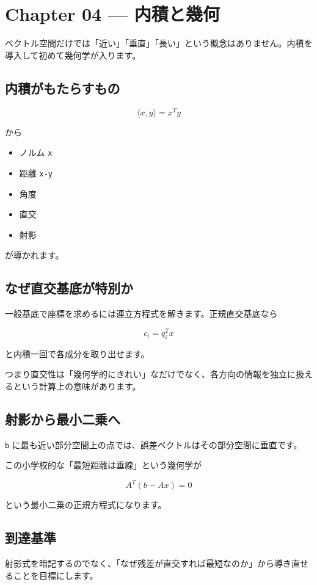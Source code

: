 \documentclass[
  11pt,
  a4paper,
]{ltjsarticle}
\author{}
\date{}
\providecommand{\tightlist}{%
  \setlength{\itemsep}{0pt}\setlength{\parskip}{0pt}}
\begin{document}
\hypertarget{chapter-04-ux5185ux7a4dux3068ux5e7eux4f55}{%
\section{Chapter 04 ---
内積と幾何}\label{chapter-04-ux5185ux7a4dux3068ux5e7eux4f55}}

ベクトル空間だけでは「近い」「垂直」「長い」という概念はありません。内積を導入して初めて幾何学が入ります。

\hypertarget{ux5185ux7a4dux304cux3082ux305fux3089ux3059ux3082ux306e}{%
\subsection{内積がもたらすもの}\label{ux5185ux7a4dux304cux3082ux305fux3089ux3059ux3082ux306e}}

\[
\langle x,y\rangle=x^Ty
\]

から

\begin{itemize}
\tightlist
\item
  ノルム \texttt{\textbar{}\textbar{}x\textbar{}\textbar{}}
\item
  距離 \texttt{\textbar{}\textbar{}x-y\textbar{}\textbar{}}
\item
  角度
\item
  直交
\item
  射影
\end{itemize}

が導かれます。

\hypertarget{ux306aux305cux76f4ux4ea4ux57faux5e95ux304cux7279ux5225ux304b}{%
\subsection{なぜ直交基底が特別か}\label{ux306aux305cux76f4ux4ea4ux57faux5e95ux304cux7279ux5225ux304b}}

一般基底で座標を求めるには連立方程式を解きます。正規直交基底なら

\[
c_i=q_i^Tx
\]

と内積一回で各成分を取り出せます。

つまり直交性は「幾何学的にきれい」なだけでなく、各方向の情報を独立に扱えるという計算上の意味があります。

\hypertarget{ux5c04ux5f71ux304bux3089ux6700ux5c0fux4e8cux4e57ux3078}{%
\subsection{射影から最小二乗へ}\label{ux5c04ux5f71ux304bux3089ux6700ux5c0fux4e8cux4e57ux3078}}

\texttt{b}
に最も近い部分空間上の点では、誤差ベクトルはその部分空間に垂直です。

この小学校的な「最短距離は垂線」という幾何学が

\[
A^T(b-Ax)=0
\]

という最小二乗の正規方程式になります。

\hypertarget{ux5230ux9054ux57faux6e96}{%
\subsection{到達基準}\label{ux5230ux9054ux57faux6e96}}

射影式を暗記するのでなく、「なぜ残差が直交すれば最短なのか」から導き直せることを目標にします。
\end{document}
